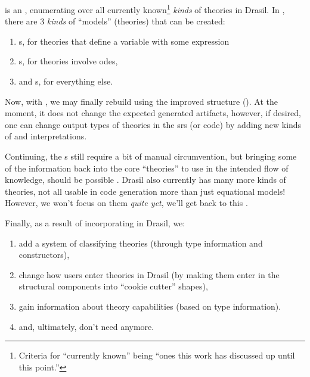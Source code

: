 \originalNewModelKindsHaskell{}

\ModelKinds{} is an , enumerating over all currently
known\footnote{Criteria for ``currently known'' being ``ones this work has
    discussed up until this point.''} \textit{kinds} of theories in Drasil. In
\ModelKinds{}, there are 3 \textit{kinds} of ``models'' (theories) that can be
created:

\begin{enumerate}
    \item \EquationalModel{}s, for theories that define a variable with some
          expression
    \item \DEModel{}s, for theories involve \acsp{ode},
    \item and \OthModel{}s, for everything else.
\end{enumerate}

Now, with \EquationalModel{}, we may finally rebuild  using
the improved structure (). At the moment, it does not
change the expected generated artifacts, however, if desired, one can change
output types of theories in the \acs{srs} (or code) by adding new kinds of
\QDefinition{} and \ModelKinds{} interpretations.

\currentLandPosIMQD{}

Continuing, the \DEModel{}s still require a bit of manual circumvention, but
bringing some of the information back into the core ``theories'' to use in the
intended flow of knowledge, should be possible \cite{Chen2022MEng}. Drasil also
currently has many more kinds of theories, not all usable in code generation
\textemdash{} more than just equational models! However, we won't focus on them
\textit{quite yet}, we'll get back to this .

Finally, as a result of incorporating \ModelKinds{} in Drasil, we:
\begin{enumerate}[label={(\alph*)}]
    \item add a system of classifying theories (through type information and
          constructors),
    \item change how users enter theories in Drasil (by making them enter in the
          structural components into ``cookie cutter'' shapes),
    \item gain information about theory capabilities (based on type
          information).
    \item and, ultimately, don't need \relToQD{} anymore.
\end{enumerate}

